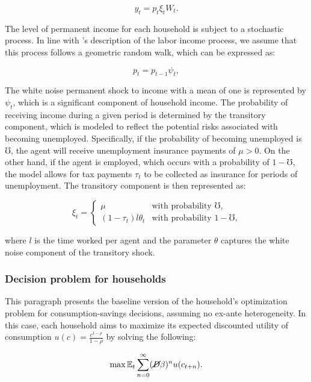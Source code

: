 $$ y_t = p_t \xi_t W_t . $$

\par The level of permanent income for each household is subject to a stochastic process. In line with \cite{mf1957}'s description of the labor income process, we assume that this process follows a geometric random walk, which can be expressed as:

$$ p_t = p_{t-1} \psi_{t}, $$

\par The white noise permanent shock to income with a mean of one is represented by $\psi_t$, which is a significant component of household income. The probability of receiving income during a given period is determined by the transitory component, which is modeled to reflect the potential risks associated with becoming unemployed. Specifically, if the probability of becoming unemployed is $\mho$, the agent will receive unemployment insurance payments of $\mu > 0$. On the other hand, if the agent is employed, which occurs with a probability of $1 - \mho$, the model allows for tax payments $\tau_t$ to be collected as insurance for periods of unemployment. The transitory component is then represented as:

\begin{equation*}
\xi_t =
    \begin{cases}
        \mu & \text{with probability $\mho$,} \\
        (1-\tau_t) l \theta_t & \text{with probability $1-\mho$,}
    \end{cases}
\end{equation*}

\par where $l$ is the time worked per agent and the parameter $\theta$ captures the white noise component of the transitory shock.


\subsubsection{Decision problem for households}

\par This paragraph presents the baseline version of the household's optimization problem for consumption-savings decisions, assuming no ex-ante heterogeneity. In this case, each household aims to maximize its expected discounted utility of consumption $u(c) = \frac{c^{1-\rho}}{1-\rho}$ by solving the following:

$$ \max \mathbb{E}_t \sum_{n=0}^{\infty}(\cancel{D}\beta)^{n} u(c_{t+n}). $$

